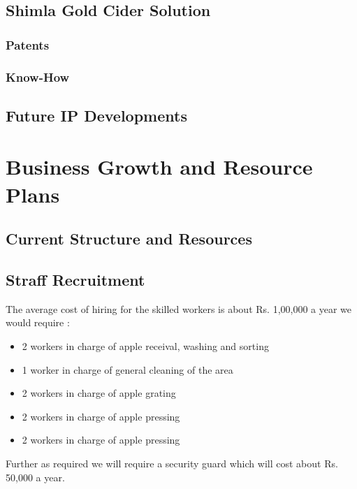 \documentclass[11pt]{article}
\begin{document}
  \subsection{Shimla Gold Cider Solution}
    \subsubsection{Patents}
    \subsubsection{Know-How}
  \subsection{Future IP Developments}
\section{Business Growth and Resource Plans}
  \subsection{Current Structure and Resources}
  \subsection{Straff Recruitment}

The average cost of hiring for the skilled workers is about Rs. 1,00,000 a year we would require :
\begin{itemize}

\item 2 workers in charge of apple receival, washing and sorting  
\item 1 worker in charge of general cleaning of the area
\item 2 workers in charge of apple grating
\item 2 workers in charge of apple pressing
\item 2 workers in charge of apple pressing 

\end{itemize}

Further as required we will require a security guard which will cost about Rs. 50,000 a year.
 
\end{document}
